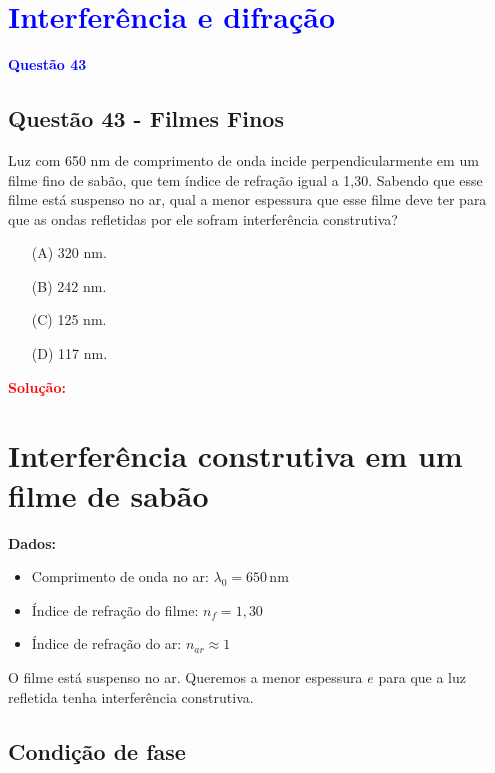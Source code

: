 \section{\large \textcolor{blue}{Interferência e difração}}

\begin{flushleft}
\textbf{\textcolor{blue}{\Large Quest\~ao 43}}\\
\noindent
\subsection{Quest\~ao 43 - Filmes Finos}
Luz com 650 nm de comprimento de onda incide
perpendicularmente em um filme fino de sabão, que tem
índice de refração igual a 1,30. Sabendo que esse filme está
suspenso no ar, qual a menor espessura que esse filme
deve ter para que as ondas refletidas por ele sofram
interferência construtiva?

\begin{itemize}
\item[(A)] 320 nm.
\item[(B)] 242 nm.
\item[(C)] 125 nm.
\item[(D)] 117 nm.
\end{itemize}

\vspace{0.5cm}

\textcolor{red}{\textbf{Solução:}}\\

\section*{Interferência construtiva em um filme de sabão}

\textbf{Dados:}
\begin{itemize}
    \item Comprimento de onda no ar: \( \lambda_0 = 650\,\mathrm{nm} \)
    \item Índice de refração do filme: \( n_f = 1{,}30 \)
    \item Índice de refração do ar: \( n_{ar} \approx 1 \)
\end{itemize}

O filme está suspenso no ar. Queremos a menor espessura \(e\) para que a luz refletida tenha interferência construtiva.

\subsection*{Condição de fase}


\end{flushleft}
